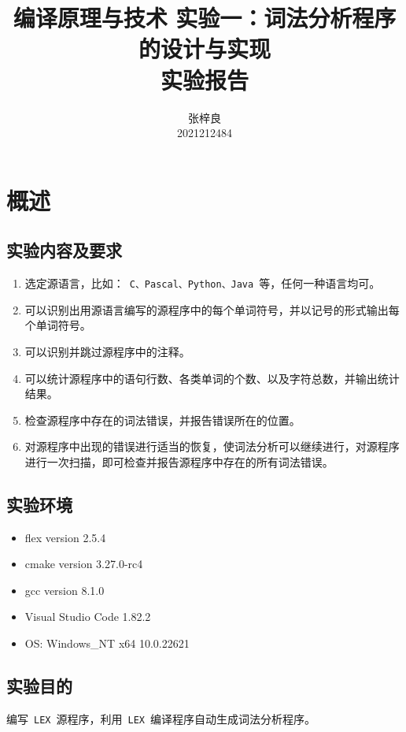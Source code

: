\documentclass[lang=cn,11pt,a4paper]{paper}
\title{编译原理与技术 实验一：词法分析程序的设计与实现 \\ 实验报告}
\author{张梓良 \\ 2021212484}
\institute{北京邮电大学 \\ 计算机科学与技术}
\date{\zhtoday}
\begin{document}
\maketitle

\section{概述}

\subsection{实验内容及要求}

\begin{enumerate}
  \item 选定源语言，比如：\ \lstinline{C、Pascal、Python、Java}\ 等，任何一种语言均可。
  \item 可以识别出用源语言编写的源程序中的每个单词符号，并以记号的形式输出每个单词符号。
  \item 可以识别并跳过源程序中的注释。
  \item 可以统计源程序中的语句行数、各类单词的个数、以及字符总数，并输出统计结果。
  \item 检查源程序中存在的词法错误，并报告错误所在的位置。
  \item 对源程序中出现的错误进行适当的恢复，使词法分析可以继续进行，对源程序进行一次扫描，即可检查并报告源程序中存在的所有词法错误。
\end{enumerate}

\subsection{实验环境}

\begin{itemize}
    \item flex version 2.5.4
    \item cmake version 3.27.0-rc4
    \item gcc version 8.1.0
    \item Visual Studio Code 1.82.2
    \item OS: Windows\_NT x64 10.0.22621
\end{itemize}

\subsection{实验目的}

编写\ \lstinline{LEX}\ 源程序，利用\ \lstinline{LEX}\ 编译程序自动生成词法分析程序。
\end{document}
